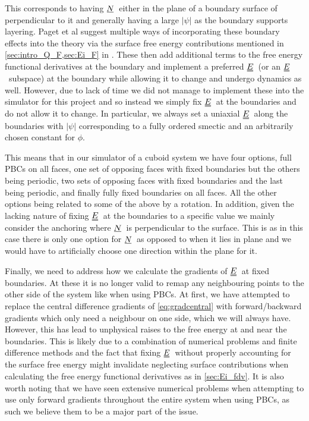 \documentclass[12pt]{article}
\newcommand{\suf}[2]{\stackunder[0.5pt]{\stackunder[1pt]{\ensuremath{#1}}{\rule{\widthof{\ensuremath{#2}}*\real{0.9}}{.1ex}}}{}}
\newcommand{\duf}[2]{\stackunder[0.5pt]{\stackunder[0.8pt]{\stackunder[1pt]{\ensuremath{#1}}{\rule{\widthof{\ensuremath{#2}}*\real{0.9}}{.1ex}}}{\rule{\widthof{\ensuremath{#2}}*\real{0.9}}{.1ex}}}{}}
\newcommand{\su}[1]{\suf{#1}{#1}}
\newcommand{\du}[1]{\duf{#1}{#1}}
\newcommand{\NN}{\ensuremath{\su{N}}}
\newcommand{\EE}{\ensuremath{\du{E}}}
\begin{document}
        This corresponds to having \NN\ either in the plane of a boundary surface of perpendicular to it and generally having a large $|\psi|$ as the boundary supports layering.
        Paget et al suggest multiple ways of incorporating these boundary effects into the theory via the surface free energy contributions mentioned in \cref{sec:intro_Q_F,sec:Ei_F} in \cite{pagetComplexTensorsSimple2023}.
        These then add additional terms to the free energy functional derivatives at the boundary and implement a preferred \EE\ (or an \EE\ subspace) at the boundary while allowing it to change and undergo dynamics as well.
        However, due to lack of time we did not manage to implement these into the simulator for this project and so instead we simply fix \EE\ at the boundaries and do not allow it to change.
        In particular, we always set a uniaxial \EE\ along the boundaries with $|\psi|$ corresponding to a fully ordered smectic and an arbitrarily chosen constant for $\phi$.

        This means that in our simulator of a cuboid system we have four options, full PBCs on all faces, one set of opposing faces with fixed boundaries but the others being periodic, two sets of opposing faces with fixed boundaries and the last being periodic, and finally fully fixed boundaries on all faces.
        All the other options being related to some of the above by a rotation.
        In addition, given the lacking nature of fixing \EE\ at the boundaries to a specific value we mainly consider the anchoring where \NN\ is perpendicular to the surface.
        This is as in this case there is only one option for \NN\ as opposed to when it lies in plane and we would have to artificially choose one direction within the plane for it.

        Finally, we need to address how we calculate the gradients of \EE\ at fixed boundaries.
        At these it is no longer valid to remap any neighbouring points to the other side of the system like when using PBCs.
        At first, we have attempted to replace the central difference gradients of \cref{eq:gradcentral} with forward/backward gradients which only need a neighbour on one side, which we will always have.
        However, this has lead to unphysical raises to the free energy at and near the boundaries.
        This is likely due to a combination of numerical problems and finite difference methods and the fact that fixing \EE\ without properly accounting for the surface free energy might invalidate neglecting surface contributions when calculating the free energy functional derivatives as in \cref{sec:Ei_fdv}.
        It is also worth noting that we have seen extensive numerical problems when attempting to use only forward gradients throughout the entire system when using PBCs, as such we believe them to be a major part of the issue.
\end{document}
